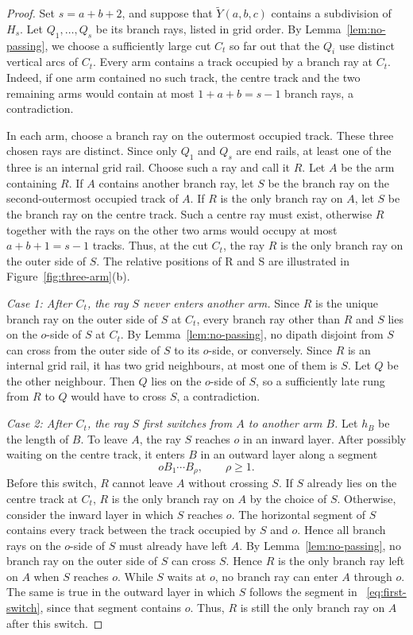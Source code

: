 \documentclass[11pt]{article}
\theoremstyle{remark}
\numberwithin{equation}{section}
\begin{document}
\begin{proof}
Set $s=a+b+2$, and suppose that $\widetilde{Y}(a,b,c)$ contains a subdivision of $H_s$. Let $Q_1,\ldots,Q_s$ be its branch rays, listed in grid order. By Lemma~\ref{lem:no-passing}, we choose a sufficiently large cut $C_t$ so far out that the $Q_i$ use distinct vertical arcs of $C_t$. Every arm contains a track occupied by a branch ray at $C_t$. Indeed, if one arm contained no such track, the centre track and the two remaining arms would contain at most $1+a+b=s-1$ branch rays, a contradiction.

In each arm, choose a branch ray on the outermost occupied track. These three chosen rays are distinct. Since only $Q_1$ and $Q_s$ are end rails, at least one of the three is an internal grid rail. Choose such a ray and call it $R$. Let $A$ be the arm containing $R$. If $A$ contains another branch ray, let $S$ be the branch ray on the second-outermost occupied track of $A$. If $R$ is the only branch ray on $A$, let $S$ be the branch ray on the centre track. Such a centre ray must exist, otherwise $R$ together with the rays on the other two arms would occupy at most $a+b+1=s-1$ tracks. Thus, at the cut $C_t$, the ray $R$ is the only branch ray on the outer side of $S$. The relative positions of R and S are illustrated in Figure~\ref{fig:three-arm}(b).

\emph{Case 1: After $C_t$, the ray $S$ never enters another arm.}
Since $R$ is the unique branch ray on the outer side of $S$ at $C_t$, every branch ray other than $R$ and $S$ lies on the $o$-side of $S$ at $C_t$. By Lemma~\ref{lem:no-passing}, no dipath disjoint from $S$ can cross from the outer side of $S$ to its $o$-side, or conversely. Since $R$ is an internal grid rail, it has two grid neighbours, at most one of them is $S$. Let $Q$ be the other neighbour. Then $Q$ lies on the $o$-side of $S$, so a sufficiently late rung from $R$ to $Q$ would have to cross $S$, a contradiction.

\emph{Case 2: After $C_t$, the ray $S$ first switches from $A$ to another arm $B$.}
Let $h_B$ be the length of $B$. To leave $A$, the ray $S$ reaches $o$ in an inward layer. After possibly waiting on the centre track, it enters $B$ in an outward layer along a segment
\begin{equation}\label{eq:first-switch}
oB_1\cdots B_\rho,
\qquad \rho\ge1.
\end{equation}
Before this switch, $R$ cannot leave $A$ without crossing $S$. If $S$ already lies on the centre track at $C_t$, $R$ is the only branch ray on $A$ by the choice of $S$. Otherwise, consider the inward layer in which $S$ reaches $o$. The horizontal segment of $S$ contains every track between the track occupied by $S$ and $o$. Hence all branch rays on the $o$-side of $S$ must already have left $A$. By Lemma~\ref{lem:no-passing}, no branch ray on the outer side of $S$ can cross $S$. Hence $R$ is the only branch ray left on $A$ when $S$ reaches $o$. While $S$ waits at $o$, no branch ray can enter $A$ through $o$. The same is true in the outward layer in which $S$ follows the segment in ~\eqref{eq:first-switch}, since that segment contains $o$. Thus, $R$ is still the only branch ray on $A$ after this switch.


\end{proof}
\end{document}

